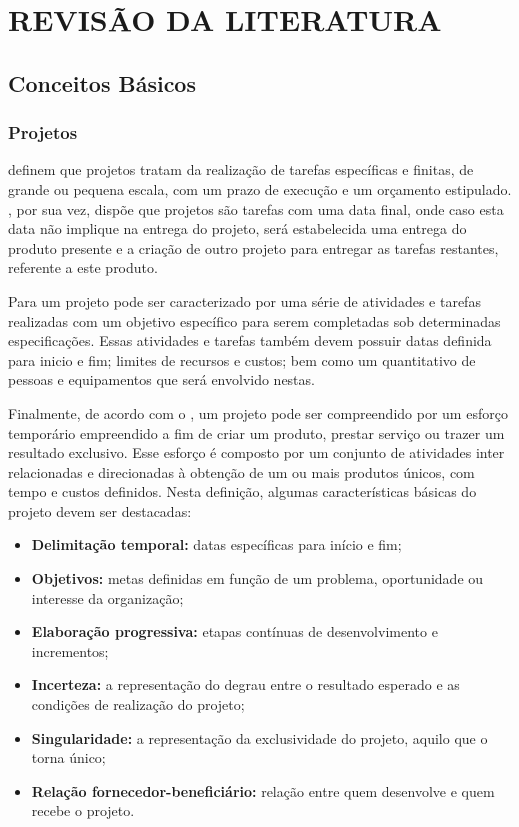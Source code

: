 \chapter{REVISÃO DA LITERATURA}
\thispagestyle{empty}

\section{Conceitos Básicos}
\subsection{Projetos}

   definem que projetos tratam da realização de tarefas específicas e finitas, de grande ou pequena escala, com um prazo de execução e um orçamento estipulado. , por sua vez, dispõe que projetos são tarefas com uma data final, onde caso esta data não implique na entrega do projeto, será estabelecida uma entrega do produto presente e a criação de outro projeto para entregar as tarefas restantes, referente a este produto.

  Para  um projeto pode ser caracterizado por uma série de atividades e tarefas realizadas com um objetivo específico para serem completadas sob determinadas especificações. Essas atividades e tarefas também devem possuir datas definida para inicio e fim; limites de recursos e custos; bem como um quantitativo de pessoas e equipamentos que será envolvido nestas.

  Finalmente, de acordo com o , um projeto pode ser compreendido por um esforço temporário empreendido a fim de criar um produto, prestar serviço ou trazer um resultado exclusivo. Esse esforço é composto por um conjunto de atividades inter relacionadas e direcionadas à obtenção de um ou mais produtos únicos, com tempo e custos definidos. Nesta definição, algumas características básicas do projeto devem ser destacadas:

  \begin{itemize}
    \item{\textbf{Delimitação temporal:} datas específicas para início e fim;}
    \item{\textbf{Objetivos:} metas definidas em função de um problema, oportunidade ou interesse da organização;}
    \item{\textbf{Elaboração progressiva:} etapas contínuas de desenvolvimento e incrementos;}
    \item{\textbf{Incerteza:} a representação do degrau entre o resultado esperado e as condições de realização do projeto;}
    \item{\textbf{Singularidade:} a representação da exclusividade do projeto, aquilo que o torna único;}
    \item{\textbf{Relação fornecedor-beneficiário:} relação entre quem desenvolve e quem recebe o projeto.}
  \end{itemize}

